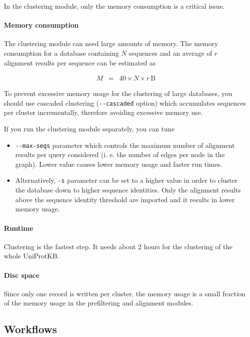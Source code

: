 \documentclass[11pt,a4paper]{report}
\begin{document}
In the clustering module, only the memory consumption is a critical
issue.


\paragraph{Memory consumption}

The clustering module can need large amounts of memory. The memory
consumption for a database containing $N$ sequences and an average
of $r$ alignment results per sequence can be estimated as

\begin{eqnarray*}
M & = & 40\times N\times r\,\mathrm{B}\end{eqnarray*}
 

To prevent excessive memory usage for the clustering of large databases,
you should use cascaded clustering (\texttt{-{}-cascaded} option)
which accumulates sequences per cluster incrementally, therefore avoiding
excessive memory use.

If you run the clustering module separately, you can tune
\begin{itemize}
\item \texttt{-{}-max-seqs} parameter which controls the maximum number
of alignment results per query considered (i. e. the number of edges
per node in the graph). Lower value causes lower memory usage and
faster run times.
\item Alternatively, \texttt{-s} parameter can be set to a higher value
in order to cluster the database down to higher sequence identities.
Only the alignment results above the sequence identity threshold are
imported and it results in lower memory usage. 
\end{itemize}

\paragraph{Runtime}

Clustering is the fastest step. It needs about 2 hours for the clustering
of the whole UniProtKB. 


\paragraph{Disc space}

Since only one record is written per cluster, the memory usage is
a small fraction of the memory usage in the prefiltering and alignment
modules.


\subsection{Workflows}
\end{document}
